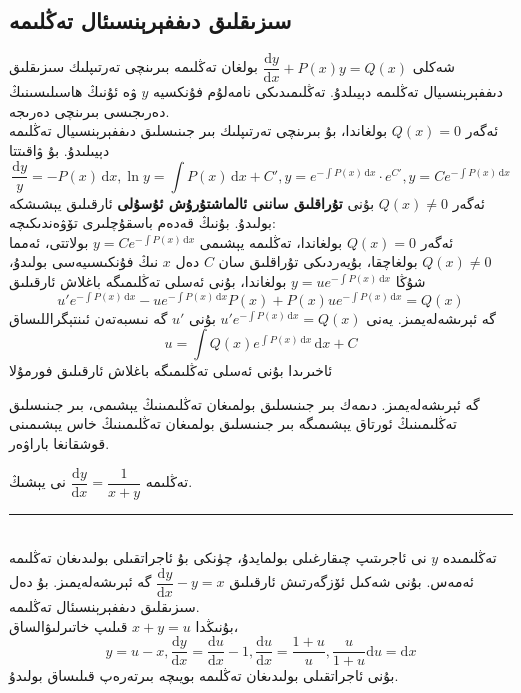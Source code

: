 \subsection{سىزىقلىق دىففېرېنسىئال تەڭلىمە}
شەكلى 
$\dfrac{\textrm{d}y}{\textrm{d}x}+P(x)y=Q(x)$
بولغان تەڭلىمە بىرىنچى تەرتىپلىك سىزىقلىق دىففېرېنسىيال تەڭلىمە دېيىلدۇ. تەڭلىمىدىكى نامەلۇم فۇنكسيە $y$ ۋە ئۇنىڭ ھاسىلىسىنىڭ دەرىجىسى بىرىنچى دەرىجە.\\
ئەگەر $Q(x)=0$ بولغاندا، بۇ بىرىنچى تەرتىپلىك بىر جىنىسلىق دىففېرېنسىيال تەڭلىمە دېيىلىدۇ. بۇ ۋاقىتتا 
$$\dfrac{\textrm{d}y}{y}=-P(x)\,\textrm{d}x,\ln y=\int P(x)\,\textrm{d}x+C',y=e^{-\int P(x)\,\textrm{d}x}\cdot e^{C'},y=Ce^{-\int P(x)\,\textrm{d}x}$$
ئەگەر 
$Q(x)\neq 0$
بۇنى \textbf{تۇراقلىق ساننى ئالماشتۇرۇش ئۇسۇلى } ئارقىلىق يېشىشكە بولىدۇ. بۇنىڭ قەدەم باسقۇچلىرى تۆۋەندىكىچە:\\
ئەگەر 
$Q(x)=0$
بولغاندا، تەڭلىمە يېشىمى
$y=Ce^{-\int P(x)\,\textrm{d}x}$
بولاتتى، ئەمما $Q(x)\neq 0$
بولغاچقا، بۇيەردىكى تۇراقلىق سان $C$ دەل $x$ نىڭ فۇنكىسىيەسى بولىدۇ، شۇڭا 
$y=ue^{-\int P(x)\,\textrm{d}x}$
بولغاندا، بۇنى ئەسلى تەڭلىمىگە باغلاش ئارقىلىق
$$u'e^{-\int P(x)\,\textrm{d}x}-ue^{-\int P(x)\,\textrm{d}x}P(x)+P(x)ue^{-\int P(x)\,\textrm{d}x}=Q(x)$$
گە ئېرىشەلەيمىز. يەنى
$u'e^{-\int P(x)\,\textrm{d}x}=Q(x)$
بۇنى $u'$ گە نىسبەتەن ئىنتېگراللىساق
$$
u=\displaystyle{\int Q(x)e^{\int P(x)\,\textrm{d}x}\,\textrm{d}x}+C
$$
ئاخىرىدا بۇنى ئەسلى تەڭلىمىگە باغلاش ئارقىلىق فورمۇلا
\begin{center}
\end{center}

گە ئېرىشەلەيمىز. دىمەك بىر جىنىسلىق بولمىغان تەڭلىمىنىڭ يېشىمى، بىر جىنىسلىق تەڭلىمىنىڭ ئورتاق يېشىمىگە بىر جىنىسلىق بولمىغان تەڭلىمىنىڭ خاس يېشىمىنى قوشقانغا باراۋەر.

\begin{myexample}
	تەڭلىمە
	$\dfrac{\textrm{d}y}{\textrm{d}x}=\dfrac{1}{x+y}$
	نى يېشىڭ.
	\\\rule{\linewidth}{0.05em}\\
	تەڭلىمىدە $y$ نى ئاجرىتىپ چىقارغىلى بولمايدۇ، چۈنكى بۇ ئاجراتقىلى بولىدىغان تەڭلىمە ئەمەس. بۇنى شەكىل ئۆزگەرتىش ئارقىلىق
	$\dfrac{\textrm{d}y}{\textrm{d}x}-y=x$
	گە ئېرىشەلەيمىز. بۇ دەل سىزىقلىق دىففېرېنسىئال تەڭلىمە.\\
	بۇنىڭدا $x+y=u$ قىلىپ خاتىرلىۋالساق،
$$y=u-x, \dfrac{\textrm{d}y}{\textrm{d}x}=\dfrac{\textrm{d}u}{\textrm{d}x}-1, \dfrac{\textrm{d}u}{\textrm{d}x}=\dfrac{1+u}{u}, \dfrac{u}{1+u}\textrm{d}u=\textrm{d}x$$
بۇنى ئاجراتقىلى بولىدىغان تەڭلىمە بويىچە بىرتەرەپ قىلىساق بولىدۇ.
\end{myexample}

